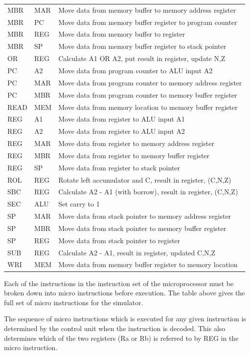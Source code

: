 \documentclass{article}
\begin{document}
\begin{tabular}{ m{1cm} m{1cm} m{11cm} }
    MBR & MAR & Move data from memory buffer to memory address register \\
    MBR & PC  & Move data from memory buffer register to program counter \\
    MBR & REG & Move data from memory buffer to register \\
    MBR & SP  & Move data from memory buffer register to stack pointer \\
    OR  & REG & Calculate A1 OR A2, put result in register, update N,Z \\
    PC  & A2  & Move data from program counter to ALU input A2 \\
    PC  & MAR & Move data from program counter to memory address register \\
    PC  & MBR & Move data from program counter to memory buffer register \\
    READ & MEM & Move data from memory location to memory buffer register \\
    REG & A1  & Move data from register to ALU input A1 \\
    REG & A2  & Move data from register to ALU input A2 \\
    REG & MAR & Move data from register to memory address register \\
    REG & MBR & Move data from register to memory buffer register \\
    REG & SP  & Move data from register to stack pointer \\
    ROL & REG & Rotate left accumulator and C, result in register, (C,N,Z) \\
    SBC & REG & Calculate A2 - A1 (with borrow), result in register, (C,N,Z) \\
    SEC & ALU & Set carry to 1 \\
    SP  & MAR & Move data from stack pointer to memory address register \\
    SP  & MBR & Move data from stack pointer to memory buffer register \\
    SP  & REG & Move data from stack pointer to register \\
    SUB & REG & Calculate A2 - A1, result in register, updated C,N,Z \\
    WRI & MEM & Move data from memory buffer register to memory location \\ [2ex]
\end{tabular}

\normalsize

Each of the instructions in the instruction set of the microprocessor must be broken down into micro instructions before execution. The table above gives the full set of micro instructions for the simulator.

The sequence of micro instructions which is executed for any given instruction is determined by the control unit when the instruction is decoded. This also determines which of the two registers (Ra or Rb) is referred to by REG in the micro instruction.
\end{document}
